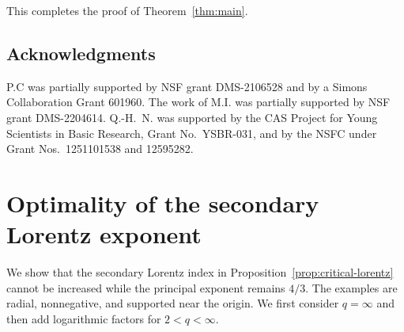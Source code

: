 \documentclass[11pt,reqno]{amsproc}
\begin{document}
This completes the proof of Theorem~\ref{thm:main}.

\subsection*{Acknowledgments} P.C was partially supported by NSF grant DMS-2106528
and by a Simons Collaboration Grant 601960. The work of M.I. was partially supported by NSF grant DMS-2204614.
Q.-H.~N. was supported by the CAS Project for Young Scientists in Basic
Research, Grant No.~YSBR-031, and by the NSFC under Grant
Nos.~1251101538 and 12595282.

\appendix

\section{Optimality of the secondary Lorentz exponent}\label{app:sharpness}

We show that the secondary Lorentz index in
Proposition~\ref{prop:critical-lorentz} cannot be increased while the principal
exponent remains $4/3$.  The examples are radial, nonnegative, and supported
near the origin.  We first consider $q=\infty$ and then add logarithmic factors
for $2<q<\infty$.
\end{document}
